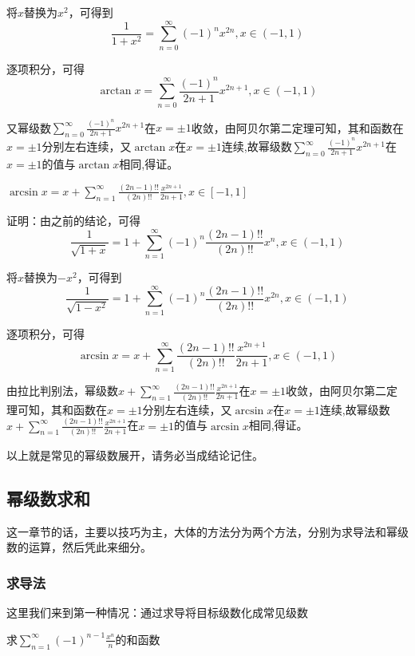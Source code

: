 \documentclass[lang=cn,10pt]{elegantbook}
\begin{document}
将$x$替换为$x^{2}$，可得到
\begin{equation*}
	\frac{1}{1+x^{2}}=\sum_{n=0}^{\infty }(-1)^{n}x^{2n},x \in (-1,1)
\end{equation*}

逐项积分，可得
\begin{equation*}
	\arctan x=\sum_{n=0}^{\infty }  \frac{(-1)^{n}}{2n+1}x^{2n+1},x\in(-1,1)
\end{equation*}

又幂级数$\sum_{n=0}^{\infty }  \frac{(-1)^{n}}{2n+1}x^{2n+1}$在$x=\pm1$收敛，由阿贝尔第二定理可知，其和函数在$x=\pm1$分别左右连续，又$\arctan x$在$x=\pm1$连续,故幂级数$\sum_{n=0}^{\infty }  \frac{(-1)^{n}}{2n+1}x^{2n+1}$在$x=\pm1$的值与$\arctan x$相同,得证。

\begin{conclusion}
	$\arcsin x=x+\sum_{n=1}^{\infty }  \frac{(2n-1)!!}{(2n)!!}\frac{x^{2n+1}}{2n+1},x\in[-1,1]$
\end{conclusion}

证明：由之前的结论，可得
\begin{equation*}
	\frac{1}{\sqrt{1+x}}=1+\sum_{n=1}^{\infty }(-1)^{n}\frac{(2n-1)!!}{(2n)!!}x^{n},x \in (-1,1)
\end{equation*}

将$x$替换为$-x^{2}$，可得到
\begin{equation*}
	\frac{1}{\sqrt{1-x^{2}}}=1+\sum_{n=1}^{\infty }(-1)^{n}\frac{(2n-1)!!}{(2n)!!}x^{2n},x \in (-1,1)
\end{equation*}

逐项积分，可得
\begin{equation*}
	\arcsin x=x+\sum_{n=1}^{\infty }  \frac{(2n-1)!!}{(2n)!!}\frac{x^{2n+1}}{2n+1},x\in (-1,1)
\end{equation*}

由拉比判别法，幂级数$x+\sum_{n=1}^{\infty }  \frac{(2n-1)!!}{(2n)!!}\frac{x^{2n+1}}{2n+1} $在$x=\pm1$收敛，由阿贝尔第二定理可知，其和函数在$x=\pm1$分别左右连续，又$\arcsin x$在$x=\pm1$连续,故幂级数$x+\sum_{n=1}^{\infty }  \frac{(2n-1)!!}{(2n)!!}\frac{x^{2n+1}}{2n+1}$在$x=\pm1$的值与$\arcsin x$相同,得证。

以上就是常见的幂级数展开，请务必当成结论记住。
\subsection{幂级数求和}
	这一章节的话，主要以技巧为主，大体的方法分为两个方法，分别为求导法和幂级数的运算，然后凭此来细分。
	
	\subsubsection{求导法}
	这里我们来到第一种情况：通过求导将目标级数化成常见级数
		\begin{example}
			求$\sum_{n=1}^{\infty } (-1)^{n-1}\frac{x^{n} }{n}$的和函数  
		\end{example}
		
\end{document}
